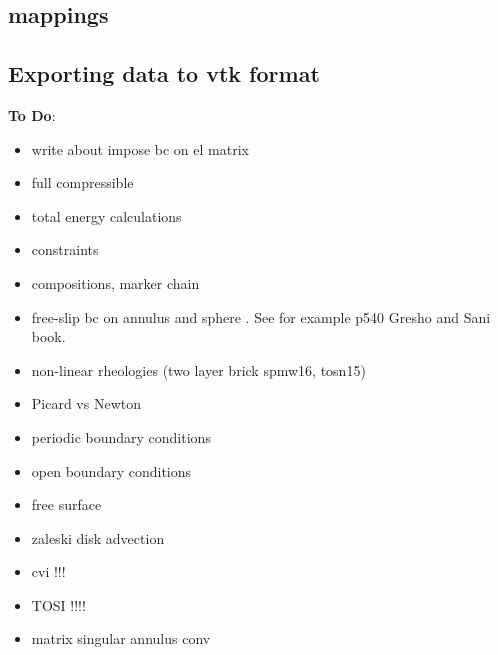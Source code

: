 \documentclass[a4paper]{article}
\begin{document}
\subsection{mappings}  %

\newpage %
\subsection{Exporting data to vtk format}  %







\newpage
{\bf To Do}:

\begin{itemize}
\item
write about impose bc on el matrix

\item
full compressible 

\item
total energy calculations

\item
constraints

\item
compositions, marker chain

\item
free-slip bc on annulus and sphere . See for example p540 Gresho and Sani book.

\item
non-linear rheologies (two layer brick spmw16, tosn15) 

\item
Picard vs Newton

\item
periodic boundary conditions

\item
open boundary conditions

\item
free surface 

\item
zaleski disk advection

\item
cvi !!!

\item TOSI !!!!

\item matrix singular annulus conv


\end{itemize}
\end{document}
